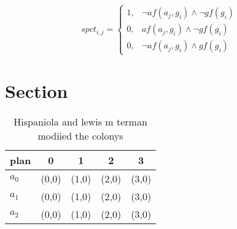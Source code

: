 \documentclass[a4paper]{article}
\begin{document}
\begin{equation}
spct_{i,j} =
\begin{cases}
1, & \text{$\neg af(a_j,g_i) \wedge \neg gf(g_i)$}\\
0, & \text{$af(a_j,g_i) \wedge \neg gf(g_i)$}\\
0, & \text{$\neg af(a_j,g_i) \wedge gf(g_i)$}
\end{cases}
\end{equation}

\section{Section}

\begin{table}
\begin{adjustbox}{width=0.9\columnwidth}
\begin{tabular}{|l|l|l|l|l|}
\hline
\textbf{plan} & \multicolumn{1}{c|}{\textbf{0}} & \multicolumn{1}{c|}{\textbf{1}} & \multicolumn{1}{c|}{\textbf{2}} & \multicolumn{1}{c|}{\textbf{3}} \\ \hline
\textbf{$a_0$}  & (0,0) & (1,0) & (2,0) & (3,0) \\ \hline
\textbf{$a_1$}  & (0,0) & (1,0) & (2,0) & (3,0) \\ \hline
\textbf{$a_2$}  & (0,0) & (1,0) & (2,0) & (3,0) \\ \hline
\end{tabular}
\end{adjustbox}
\caption{Hispaniola and lewis m terman modiied the colonys
}
\end{table}
\end{document}
